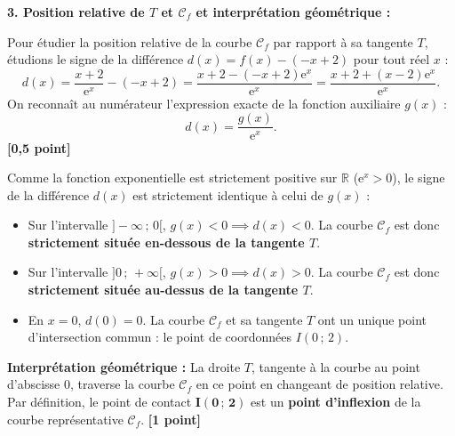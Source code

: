 \documentclass[11pt,a4paper]{article}
\newcommand{\R}{\mathbb{R}}
\newcommand{\e}{\mathrm{e}}
\begin{document}
\begin{correctionbox}
\begin{center}
\end{center}

\medskip
\textbf{3. Position relative de $T$ et $\mathcal{C}_f$ et interprétation géométrique :}

Pour étudier la position relative de la courbe $\mathcal{C}_f$ par rapport à sa tangente $T$, étudions le signe de la différence $d(x) = f(x) - (-x + 2)$ pour tout réel $x$ :
\[
d(x) = \frac{x+2}{\e^x} - (-x + 2) = \frac{x + 2 - (-x + 2)\e^x}{\e^x} = \frac{x + 2 + (x - 2)\e^x}{\e^x}.
\]
On reconnaît au numérateur l'expression exacte de la fonction auxiliaire $g(x)$ :
\[
d(x) = \frac{g(x)}{\e^x}.
\] \hfill \textbf{[0{,}5 point]}

Comme la fonction exponentielle est strictement positive sur $\R$ ($\e^x > 0$), le signe de la différence $d(x)$ est strictement identique à celui de $g(x)$ :
\begin{itemize}[leftmargin=*]
    \item Sur l'intervalle $]-\infty\,;\,0[$, $g(x) < 0 \implies d(x) < 0$.
    La courbe $\mathcal{C}_f$ est donc \textbf{strictement située en-dessous de la tangente $T$}.
    \item Sur l'intervalle $]0\,;\,+\infty[$, $g(x) > 0 \implies d(x) > 0$.
    La courbe $\mathcal{C}_f$ est donc \textbf{strictement située au-dessus de la tangente $T$}.
    \item En $x = 0$, $d(0) = 0$. La courbe $\mathcal{C}_f$ et sa tangente $T$ ont un unique point d'intersection commun : le point de coordonnées $I(0\,;\,2)$.
\end{itemize}
\textbf{Interprétation géométrique :} La droite $T$, tangente à la courbe au point d'abscisse $0$, traverse la courbe $\mathcal{C}_f$ en ce point en changeant de position relative. Par définition, le point de contact $\mathbf{I(0\,;\,2)}$ est un \textbf{point d'inflexion} de la courbe représentative $\mathcal{C}_f$. \hfill \textbf{[1 point]}
\end{correctionbox}
\end{document}
